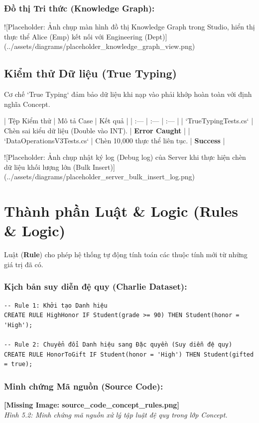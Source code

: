 \subsubsection{Đồ thị Tri thức (Knowledge Graph):}

![Placeholder: Ảnh chụp màn hình đồ thị Knowledge Graph trong Studio, hiển thị thực thể Alice (Emp) kết nối với Engineering (Dept)](../assets/diagrams/placeholder\_knowledge\_graph\_view.png)

\subsection{Kiểm thử Dữ liệu (True Typing)}

Cơ chế `True Typing` đảm bảo dữ liệu khi nạp vào phải khớp hoàn toàn với định nghĩa Concept. 

| Tệp Kiểm thử | Mô tả Case | Kết quả |
| :--- | :--- | :--- |
| `TrueTypingTests.cs` | Chèn sai kiểu dữ liệu (Double vào INT). | \textbf{Error Caught} |
| `DataOperationsV3Tests.cs` | Chèn 10,000 thực thể liên tục. | \textbf{Success} |

![Placeholder: Ảnh chụp nhật ký log (Debug log) của Server khi thực hiện chèn dữ liệu khối lượng lớn (Bulk Insert)](../assets/diagrams/placeholder\_server\_bulk\_insert\_log.png)

\section{Thành phần Luật & Logic (Rules & Logic)}

Luật (\textbf{Rule}) cho phép hệ thống tự động tính toán các thuộc tính mới từ những giá trị đã có.

\subsubsection{Kịch bản suy diễn đệ quy (Charlie Dataset):}
\begin{verbatim}
-- Rule 1: Khởi tạo Danh hiệu
CREATE RULE HighHonor IF Student(grade >= 90) THEN Student(honor = 'High');

-- Rule 2: Chuyển đổi Danh hiệu sang Đặc quyền (Suy diễn đệ quy)
CREATE RULE HonorToGift IF Student(honor = 'High') THEN Student(gifted = true);
\end{verbatim}

\subsubsection{Minh chứng Mã nguồn (Source Code):}
\textbf{[Missing Image: source_code_concept_rules.png]}\\ \textit{Hình 5.2: Minh chứng mã nguồn xử lý tập luật đệ quy trong lớp Concept.}


